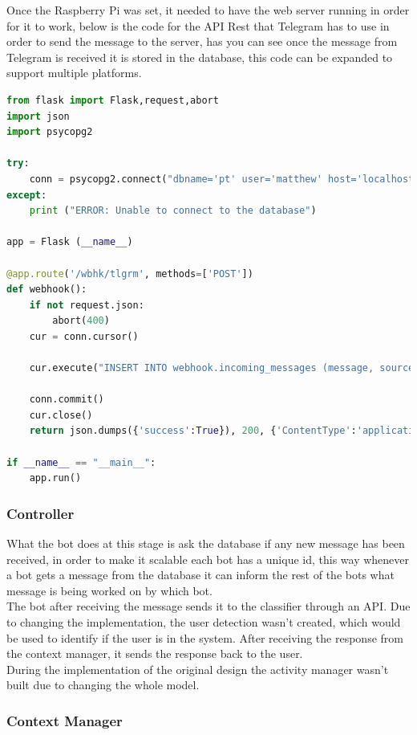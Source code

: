 Once the Raspberry  Pi was set, it needed to have the web server running in order for it to work, below is the code for the API Rest that Telegram has to use in order to send the message to the server, has you can see once the message from Telegram is received it is stored in the database, this code can be expanded to support multiple platforms.

\begin{lstlisting}[language=Python]
from flask import Flask,request,abort
import json
import psycopg2

try:
	conn = psycopg2.connect("dbname='pt' user='matthew' host='localhost' password=***")
except:
	print ("ERROR: Unable to connect to the database")

app = Flask (__name__)

@app.route('/wbhk/tlgrm', methods=['POST'])
def webhook():
	if not request.json:
		abort(400)
	cur = conn.cursor()
	
	cur.execute("INSERT INTO webhook.incoming_messages (message, source) VALUES ('"+json.dumps(request.json)+"', 'Telegram')")
	
	conn.commit()
	cur.close()
	return json.dumps({'success':True}), 200, {'ContentType':'application/json'}
	
if __name__ == "__main__":
	app.run() 

\end{lstlisting}

\subsubsection{Controller}\label{sec:chap4_ori_imp_ctrl}

What the bot does at this stage is ask the database if any new message has been received, in order to make it scalable each bot has a unique id, this way whenever a bot gets a message from the database it can inform the rest of the bots what message is being worked on by which bot.\\
The bot after receiving the message sends it to the classifier through an API. Due to changing the implementation, the user detection wasn’t created, which would be used to identify if the user is in the system. After receiving the response from the context manager, it sends the response back to the user.\\
During the implementation of the original design the activity manager wasn’t built due to changing the whole model.

\subsubsection{Context Manager}\label{sec:chap4_ori_imp_manager}

